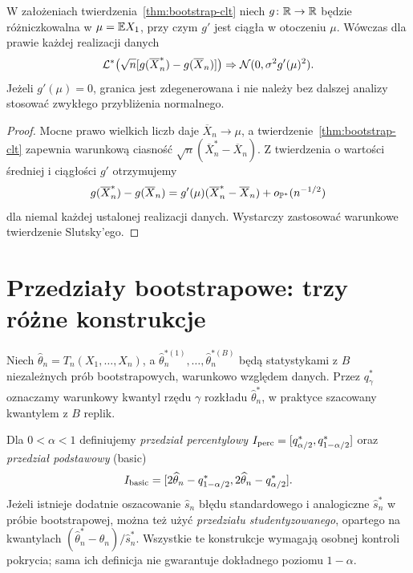\begin{wniosek}
\label{cor:bootstrap-delta}
W założeniach twierdzenia~\ref{thm:bootstrap-clt} niech
$g\colon\mathbb R\to\mathbb R$ będzie różniczkowalna w
$\mu=\mathbb E X_1$, przy czym $g'$ jest ciągła w otoczeniu $\mu$.
Wówczas dla prawie każdej realizacji danych
\[
 \mathcal L^*\bigl(\sqrt n[g(\overline X_n^*)-g(\overline X_n)]\bigr)
 \Rightarrow \mathcal N(0,\sigma^2g'(\mu)^2).
\]
Jeżeli $g'(\mu)=0$, granica jest zdegenerowana i nie należy
bez dalszej analizy stosować zwykłego przybliżenia normalnego.
\end{wniosek}
\begin{proof}
Mocne prawo wielkich liczb daje $\overline X_n\to\mu$,
a twierdzenie~\ref{thm:bootstrap-clt} zapewnia warunkową
ciasność $\sqrt n(\overline X_n^*-\overline X_n)$.
Z twierdzenia o wartości średniej i ciągłości $g'$ otrzymujemy
\[
 g(\overline X_n^*)-g(\overline X_n)
 =g'(\mu)(\overline X_n^*-\overline X_n)
   +o_{\mathbb P^*}(n^{-1/2})
\]
dla niemal każdej ustalonej realizacji danych.
Wystarczy zastosować warunkowe twierdzenie Slutsky'ego.
\end{proof}

\section{Przedziały bootstrapowe: trzy różne konstrukcje}
Niech $\widehat\theta_n=T_n(X_1,\ldots,X_n)$,
a $\widehat\theta_n^{*(1)},\ldots,\widehat\theta_n^{*(B)}$
będą statystykami z $B$ niezależnych prób bootstrapowych,
warunkowo względem danych. Przez $q_\gamma^*$ oznaczamy
warunkowy kwantyl rzędu $\gamma$ rozkładu
$\widehat\theta_n^*$, w praktyce szacowany kwantylem
z $B$ replik.

\begin{definicja}
\label{def:bootstrap-intervals}
Dla $0<\alpha<1$ definiujemy \emph{przedział percentylowy}
$I_{\rm perc}=[q_{\alpha/2}^*,q_{1-\alpha/2}^*]$
oraz \emph{przedział podstawowy} (basic)
\[
 I_{\rm basic}=
 [2\widehat\theta_n-q_{1-\alpha/2}^*,
  2\widehat\theta_n-q_{\alpha/2}^*].
\]
Jeżeli istnieje dodatnie oszacowanie $\widehat s_n$ błędu
standardowego i analogiczne $\widehat s_n^*$ w próbie bootstrapowej,
można też użyć \emph{przedziału studentyzowanego},
opartego na kwantylach
$(\widehat\theta_n^*-\widehat\theta_n)/\widehat s_n^*$.
Wszystkie te konstrukcje wymagają osobnej kontroli pokrycia;
sama ich definicja nie gwarantuje dokładnego poziomu $1-\alpha$.
\end{definicja}

